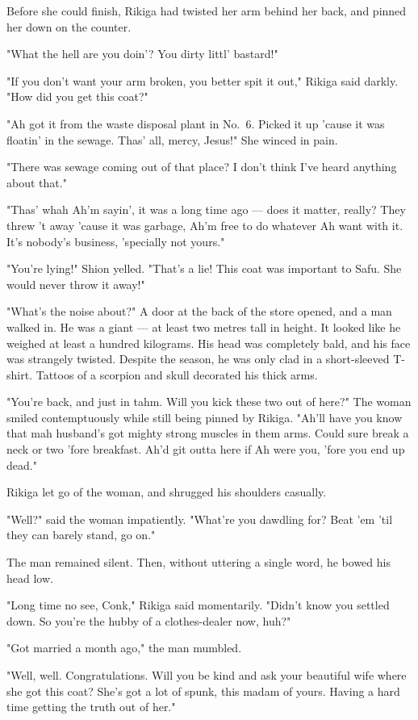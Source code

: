Before she could finish, Rikiga had twisted her arm behind her back, and
pinned her down on the counter.

"What the hell are you doin'? You dirty littl' bastard!"

"If you don't want your arm broken, you better spit it out," Rikiga said
darkly. "How did you get this coat?"

"Ah got it from the waste disposal plant in No.~6. Picked it up 'cause
it was floatin' in the sewage. Thas' all, mercy, Jesus!" She winced in
pain.

"There was sewage coming out of that place? I don't think I've heard
anything about that."

"Thas' whah Ah'm sayin', it was a long time ago --- does it matter,
really? They threw 't away 'cause it was garbage, Ah'm free to do
whatever Ah want with it. It's nobody's business, 'specially not yours."

"You're lying!" Shion yelled. "That's a lie! This coat was important to
Safu. She would never throw it away!"

"What's the noise about?" A door at the back of the store opened, and a
man walked in. He was a giant --- at least two metres tall in height. It
looked like he weighed at least a hundred kilograms. His head was
completely bald, and his face was strangely twisted. Despite the season,
he was only clad in a short-sleeved T-shirt. Tattoos of a scorpion and
skull decorated his thick arms.

"You're back, and just in tahm. Will you kick these two out of here?"
The woman smiled contemptuously while still being pinned by Rikiga.
"Ah'll have you know that mah husband's got mighty strong muscles in
them arms. Could sure break a neck or two 'fore breakfast. Ah'd git
outta here if Ah were you, 'fore you end up dead."

Rikiga let go of the woman, and shrugged his shoulders casually.

"Well?" said the woman impatiently. "What're you dawdling for? Beat 'em
'til they can barely stand, go on."

The man remained silent. Then, without uttering a single word, he bowed
his head low.

"Long time no see, Conk," Rikiga said momentarily. "Didn't know you
settled down. So you're the hubby of a clothes-dealer now, huh?"

"Got married a month ago," the man mumbled.

"Well, well. Congratulations. Will you be kind and ask your beautiful
wife where she got this coat? She's got a lot of spunk, this madam of
yours. Having a hard time getting the truth out of her."

